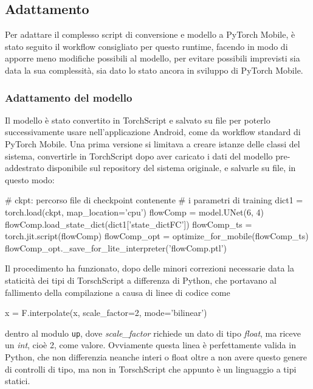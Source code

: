 \subsection{Adattamento}

Per adattare il complesso script di conversione e modello a PyTorch Mobile, è stato seguito il
workflow consigliato per questo runtime, facendo in modo di apporre meno modifiche possibili
al modello, per evitare possibili imprevisti sia data la sua complessità, sia dato lo stato 
ancora in sviluppo di PyTorch Mobile.

\subsubsection*{Adattamento del modello}
\label{sec:adattamento-modello}

Il modello è stato convertito in TorchScript e salvato su file per poterlo successivamente usare
nell'applicazione Android, come da workflow standard di PyTorch Mobile. Una prima versione
si limitava a creare istanze delle classi del sistema, convertirle in TorchScript dopo aver 
caricato i dati del modello pre-addestrato disponibile sul repository del sistema originale, 
e salvarle su file, in questo modo:

\begin{Python}
# ckpt: percorso file di checkpoint contenente 
# i parametri di training
dict1 = torch.load(ckpt, map_location='cpu')
flowComp = model.UNet(6, 4)
flowComp.load_state_dict(dict1['state_dictFC'])
flowComp_ts = torch.jit.script(flowComp)
flowComp_opt = optimize_for_mobile(flowComp_ts)
flowComp_opt._save_for_lite_interpreter('flowComp.ptl')
\end{Python}

Il procedimento ha funzionato, dopo delle minori correzioni necessarie data la staticità
dei tipi di TorschScript a differenza di Python, che portavano al fallimento della compilazione
a causa di linee di codice come

\begin{Python}
x = F.interpolate(x, scale_factor=2, mode='bilinear')
\end{Python}

dentro al modulo \texttt{up}, dove \emph{scale\_factor} richiede un dato di tipo \emph{float}, 
ma riceve un \emph{int}, cioè 2, come valore. Ovviamente questa linea è perfettamente valida in 
Python, che non differenzia neanche interi o float oltre a non avere questo genere di controlli
di tipo, ma non in TorschScript che appunto è un linguaggio a tipi statici.

